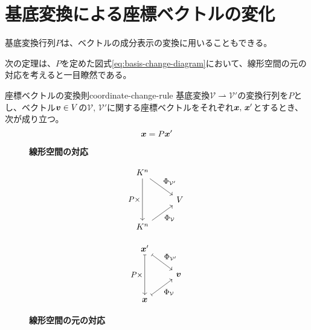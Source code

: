 \documentclass[../../../topic_linear-algebra]{subfiles}
\begin{document}
\sectionline
\section{基底変換による座標ベクトルの変化}

基底変換行列$P$は、ベクトルの成分表示の変換に用いることもできる。

次の定理は、$P$を定めた図式\eqref{eq:basis-change-diagram}において、線形空間の元の対応を考えると一目瞭然である。

\begin{theorem}{座標ベクトルの変換則}{coordinate-change-rule}
  基底変換$\mathcal{V} \rightharpoonup \mathcal{V}'$の変換行列を$P$とし、ベクトル$\vb*{v} \in V$の$\mathcal{V},\, \mathcal{V}'$に関する座標ベクトルをそれぞれ$\vb*{x},\, \vb*{x}'$とするとき、次が成り立つ。
  \begin{equation*}
    \vb*{x} = P \vb*{x}'
  \end{equation*}
\end{theorem}

\begin{figure}[h]
  \centering
  \begin{minipage}{0.4\columnwidth}
    \caption*{\bfseries 線形空間の対応}
    \begin{equation*}
      \begin{tikzcd}[every label/.append style = {font = \small}]
        K^n \arrow[dd, "P\times"'] \arrow[rd,"{\Phi_{\mathcal{V}'}}"] & \\
        & V \\
        K^n \arrow[ru,"{\Phi_{\mathcal{V}}}"']
      \end{tikzcd}
    \end{equation*}
  \end{minipage}
  \begin{minipage}{0.4\columnwidth}
    \caption*{\bfseries 線形空間の元の対応}
    \begin{equation*}
      \begin{tikzcd}[every label/.append style = {font = \small}]
        \vb*{x}' \arrow[dd,mapsto, "P\times"'] \arrow[rd,mapsto,"{\Phi_{\mathcal{V}'}}"] & \\
        & \vb*{v} \\
        \vb*{x} \arrow[ru,mapsto,"{\Phi_{\mathcal{V}}}"']
      \end{tikzcd}
    \end{equation*}
  \end{minipage}
\end{figure}
\end{document}
